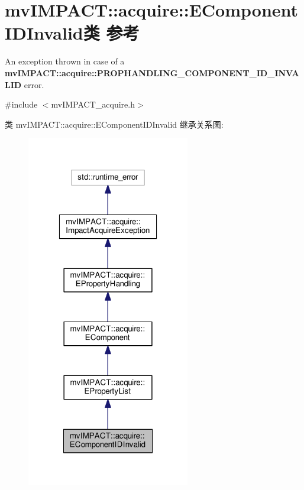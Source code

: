 \hypertarget{classmv_i_m_p_a_c_t_1_1acquire_1_1_e_component_i_d_invalid}{\section{mv\+I\+M\+P\+A\+C\+T\+:\+:acquire\+:\+:E\+Component\+I\+D\+Invalid类 参考}
\label{classmv_i_m_p_a_c_t_1_1acquire_1_1_e_component_i_d_invalid}
}


An exception thrown in case of a {\bfseries mv\+I\+M\+P\+A\+C\+T\+::acquire\+::\+P\+R\+O\+P\+H\+A\+N\+D\+L\+I\+N\+G\+\_\+\+C\+O\+M\+P\+O\+N\+E\+N\+T\+\_\+\+I\+D\+\_\+\+I\+N\+V\+A\+L\+I\+D} error.  




{\ttfamily \#include $<$mv\+I\+M\+P\+A\+C\+T\+\_\+acquire.\+h$>$}



类 mv\+I\+M\+P\+A\+C\+T\+:\+:acquire\+:\+:E\+Component\+I\+D\+Invalid 继承关系图\+:
\nopagebreak
\begin{figure}[H]
\begin{center}
\leavevmode
\includegraphics[width=202pt]{classmv_i_m_p_a_c_t_1_1acquire_1_1_e_component_i_d_invalid__inherit__graph}
\end{center}
\end{figure}


